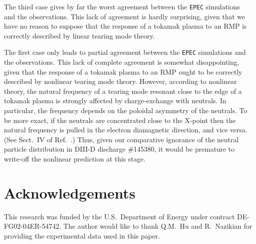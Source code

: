 \documentclass[12pt,prb,aps]{revtex4-1}
\begin{document}
 The third case gives by far the worst agreement between the {\tt EPEC} simulations and the  observations. This lack of agreement is hardly surprising, given
that we have no reason to suppose that the response of a tokamak plasma to an RMP is correctly described by linear tearing mode theory.\cite{rf1} 

The first case only leads to partial agreement between  the {\tt EPEC} simulations and the  observations. This lack of complete agreement is somewhat
disappointing, given that the response of a tokamak plasma to an RMP ought to be correctly described by nonlinear tearing mode theory. However, according to
nonlinear theory, the natural frequency of a tearing mode resonant close to the edge of a tokamak plasma is strongly affected by charge-exchange with neutrals.\cite{rf2}
In particular, the frequency depends on the poloidal asymmetry of the neutrals. To be more exact, if the neutrals are concentrated close to the X-point then the
natural frequency is pulled in the electron diamagnetic direction, and vice versa.\cite{rf2} (See Sect.~IV of Ref.~.) Thus, given our comparative ignorance of the neutral particle
distribution in DIII-D discharge \#145380, it would be premature to write-off the nonlinear prediction at this stage.  

\section*{Acknowledgements}
This research was funded by the U.S.\ Department of Energy under contract DE-FG02-04ER-54742.
The author would like to thank Q.M.~Hu and R.~Nazikian for providing the experimental data used in this paper. 
 
\end{document}
